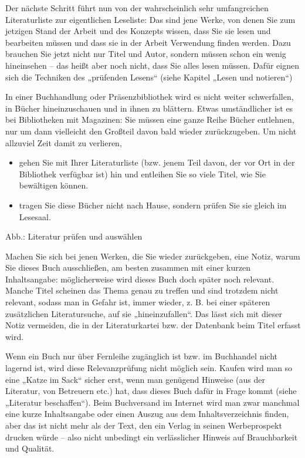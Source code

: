 \documentclass[]{book}
\providecommand{\tightlist}{%
  \setlength{\itemsep}{0pt}\setlength{\parskip}{0pt}}
\theoremstyle{definition}
\theoremstyle{definition}
\theoremstyle{definition}
\theoremstyle{remark}
\begin{document}
Der nächste Schritt führt nun von der wahrscheinlich sehr umfangreichen
Literaturliste zur eigentlichen Leseliste: Das sind jene Werke, von
denen Sie zum jetzigen Stand der Arbeit und des Konzepts wissen, dass
Sie sie lesen und bearbeiten müssen und dass sie in der Arbeit
Verwendung finden werden. Dazu brauchen Sie jetzt nicht nur Titel und
Autor, sondern müssen schon ein wenig hineinsehen -- das heißt aber noch
nicht, dass Sie alles lesen müssen. Dafür eignen sich die Techniken des
„prüfenden Lesens`` (siehe Kapitel „Lesen und notieren``)

In einer Buchhandlung oder Präsenzbibliothek wird es nicht weiter
schwerfallen, in Bücher hineinzuschauen und in ihnen zu blättern. Etwas
umständlicher ist es bei Bibliotheken mit Magazinen: Sie müssen eine
ganze Reihe Bücher entlehnen, nur um dann vielleicht den Großteil davon
bald wieder zurückzugeben. Um nicht allzuviel Zeit damit zu verlieren,

\begin{itemize}
\tightlist
\item
  gehen Sie mit Ihrer Literaturliste (bzw. jenem Teil davon, der vor Ort
  in der Bibliothek verfügbar ist) hin und entleihen Sie so viele Titel,
  wie Sie bewältigen können.
\item
  tragen Sie diese Bücher nicht nach Hause, sondern prüfen Sie sie
  gleich im Lesesaal.
\end{itemize}

Abb.: Literatur prüfen und auswählen

Machen Sie sich bei jenen Werken, die Sie wieder zurückgeben, eine
Notiz, warum Sie dieses Buch ausschließen, am besten zusammen mit einer
kurzen Inhaltsangabe: möglicherweise wird dieses Buch doch später noch
relevant. Manche Titel scheinen das Thema genau zu treffen und sind
trotzdem nicht relevant, sodass man in Gefahr ist, immer wieder, z. B.
bei einer späteren zusätzlichen Literatursuche, auf sie
„hineinzufallen``. Das lässt sich mit dieser Notiz vermeiden, die in der
Literaturkartei bzw. der Datenbank beim Titel erfasst wird.

Wenn ein Buch nur über Fernleihe zugänglich ist bzw. im Buchhandel nicht
lagernd ist, wird diese Relevanzprüfung nicht möglich sein. Kaufen wird
man so eine „Katze im Sack`` sicher erst, wenn man genügend Hinweise
(aus der Literatur, von Betreuern etc.) hat, dass dieses Buch dafür in
Frage kommt (siehe „Literatur beschaffen``). Beim Buchversand im
Internet wird man zwar manchmal eine kurze Inhaltsangabe oder einen
Auszug aus dem Inhaltsverzeichnis finden, aber das ist nicht mehr als
der Text, den ein Verlag in seinen Werbeprospekt drucken würde -- also
nicht unbedingt ein verlässlicher Hinweis auf Brauchbarkeit und
Qualität.
\end{document}
